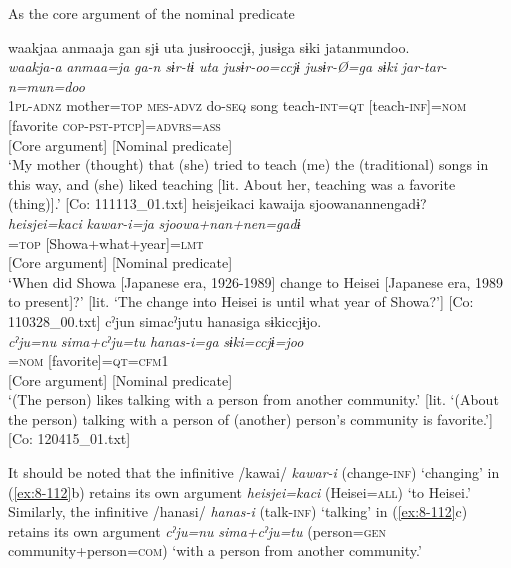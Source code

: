 \ea\label{ex:8-112}
  As the core argument of the nominal predicate

\ea
{\TM}
\gllll  waakjaa  anmaaja  gan  sjɨ  uta  jusɨrooccjɨ,      jusɨga  sɨki  jatanmundoo.\\
\textit{waakja-a}  \textit{anmaa=ja}  \textit{ga-n}  \textit{sɨr-tɨ}  \textit{uta}  \textit{jusɨr-oo=ccjɨ}      \textit{jusɨr-Ø=ga}  \textit{sɨki}  \textit{jar-tar-n=mun=doo}\\
1\textsc{pl}-\textsc{adnz}  mother=\textsc{top}  \textsc{mes}-\textsc{advz}  do-\textsc{seq}  song  teach-\textsc{int}=\textsc{qt}   [teach-\textsc{inf}]=\textsc{nom}  [favorite  \textsc{cop}-\textsc{pst}-\textsc{ptcp}]=\textsc{advrs}=\textsc{ass}\\
      {}[Core argument]  [Nominal predicate]\\
\glt ‘My mother (thought) that (she) tried to teach (me) the (traditional) songs in this way, and (she) liked teaching [lit. About her, teaching was a favorite (thing)].’ [Co: 111113\_01.txt]
\ex
{\TM}
\glll  heisjeikaci  kawaija  {\textbar}sjoowanannen{\textbar}gadɨ?\\
\textit{heisjei=kaci}  \textit{kawar-i=ja}  \textit{sjoowa+nan+nen=gadɨ}\\
[Heisei=\textsc{all}  change-\textsc{inf}]=\textsc{top}  [Showa+what+year]=\textsc{lmt}\\
{}[Core argument]  [Nominal predicate]\\
\glt ‘When did Showa [Japanese era, 1926-1989] change to Heisei [Japanese era, 1989 to present]?’ [lit. ‘The change into Heisei is until what year of Showa?’]       [Co: 110328\_00.txt]
\ex
{\TM}
\glll  cˀjun  simacˀjutu  hanasiga    sɨkiccjɨjo.\\
\textit{cˀju=nu}  \textit{sima+cˀju=tu}  \textit{hanas-i=ga}     \textit{sɨki=ccjɨ=joo}\\
[person=\textsc{gen}  community+person=\textsc{com}  talk-\textsc{inf}]=\textsc{nom}   [favorite]=\textsc{qt}=\textsc{cfm1}\\
      {}[Core argument]     [Nominal predicate]\\
\glt ‘(The person) likes talking with a person from another community.’ [lit. ‘(About the person) talking with a person of (another) person’s community is favorite.’]      [Co: 120415\_01.txt]
\z
\z

It should be noted that the infinitive /kawai/ \textit{kawar-i} (change-\textsc{inf}) ‘changing’ in (\ref{ex:8-112}b) retains its own argument \textit{heisjei=kaci} (Heisei=\textsc{all}) ‘to Heisei.’ Similarly, the infinitive /hanasi/ \textit{hanas-i} (talk-\textsc{inf}) ‘talking’ in (\ref{ex:8-112}c) retains its own argument \textit{cˀju=nu} \textit{sima+cˀju=tu} (person=\textsc{gen} community+person=\textsc{com}) ‘with a person from another community.’

